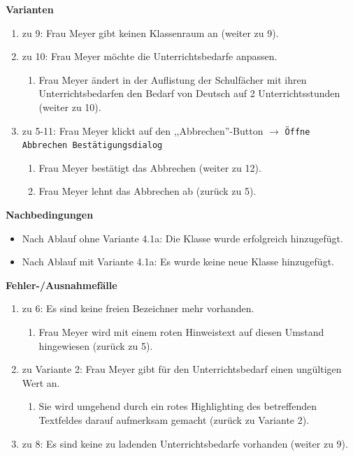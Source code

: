 \documentclass[fontsize=12pt,paper=a4,twoside]{scrartcl}
\begin{document}
\textbf{Varianten}
\begin{enumerate}
\item zu 9: Frau Meyer gibt keinen Klassenraum an (weiter zu 9). 
\item zu 10: Frau Meyer möchte die Unterrichtsbedarfe anpassen.
	\begin{enumerate}[label={\arabic*.}]
	\item Frau Meyer ändert in der Auflistung der Schulfächer mit ihren Unterrichtsbedarfen den Bedarf von Deutsch auf 2 Unterrichtsstunden (weiter zu 10).
	\end{enumerate}
\item zu 5-11: Frau Meyer klickt auf den ,,Abbrechen''-Button $\rightarrow$ \texttt{Öffne Abbrechen Bestätigungsdialog}
	\begin{enumerate}[label={1\alph*.}]
	\item Frau Meyer bestätigt das Abbrechen (weiter zu 12).
	\item Frau Meyer lehnt das Abbrechen ab (zurück zu 5).
	\end{enumerate}
\end{enumerate}
\vspace{5pt}


\textbf{Nachbedingungen}
\begin{itemize}
\item Nach Ablauf ohne Variante 4.1a: Die Klasse wurde erfolgreich hinzugefügt.
\item Nach Ablauf mit Variante 4.1a: Es wurde keine neue Klasse hinzugefügt.
\end{itemize}
\vspace{5pt}


\textbf{Fehler-/Ausnahmefälle}
\begin{enumerate}
\item zu 6: Es sind keine freien Bezeichner mehr vorhanden. 
	\begin{enumerate}[label={\arabic*.}]
	\item Frau Meyer wird mit einem roten Hinweistext auf diesen Umstand hingewiesen (zurück zu 5).
	\end{enumerate}
\item zu Variante 2: Frau Meyer gibt für den Unterrichtsbedarf einen ungültigen Wert an.
		\begin{enumerate}[label={\arabic*.}]
		\item Sie wird umgehend durch ein rotes Highlighting des betreffenden Textfeldes darauf aufmerksam gemacht (zurück zu Variante 2).
		\end{enumerate}
\item zu 8: Es sind keine zu ladenden Unterrichtsbedarfe vorhanden (weiter zu 9).

\end{enumerate}
\end{document}
